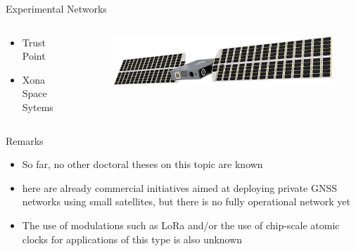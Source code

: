 \begin{frame}{Experimental Networks}

    \begin{columns}[t]
        \begin{column}[t]{0.4\textwidth}
            \begin{itemize}
                \item Trust Point
                \vspace{0.3cm}
                \item Xona Space Sytems
            \end{itemize}
        \end{column}
        \begin{column}[t]{0.6\textwidth}
            \begin{figure}[!ht]
                \begin{center}
                    \includegraphics[width=0.9\columnwidth]{figures/xona-satellite}
                \end{center}
            \end{figure}
        \end{column}
    \end{columns}

\end{frame}

\begin{frame}{Remarks}

    \begin{itemize}
        \item So far, no other doctoral theses on this topic are known
        \vspace{0.3cm}
        \item here are already commercial initiatives aimed at deploying private GNSS networks using small satellites, but there is no fully operational network yet
        \vspace{0.3cm}
        \item The use of modulations such as LoRa and/or the use of chip-scale atomic clocks for applications of this type is also unknown
    \end{itemize}

\end{frame}
